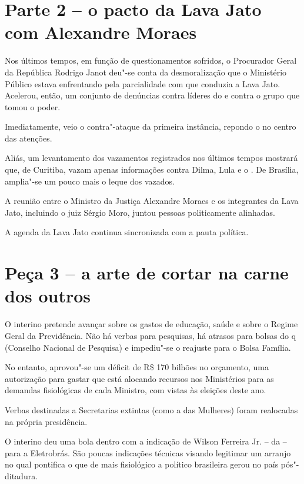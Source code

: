 \section{Parte 2 -- o pacto da Lava Jato com Alexandre Moraes}

Nos últimos tempos, em função de questionamentos sofridos, o Procurador
Geral da República Rodrigo Janot deu"-se conta da desmoralização que o
Ministério Público estava enfrentando pela parcialidade com que conduzia
a Lava Jato. Acelerou, então, um conjunto de denúncias contra líderes do
 e contra o grupo que tomou o poder.

Imediatamente, veio o contra"-ataque da primeira instância, repondo o 
no centro das atenções.

Aliás, um levantamento dos vazamentos registrados nos últimos tempos
mostrará que, de Curitiba, vazam apenas informações contra Dilma, Lula e
o . De Brasília, amplia"-se um pouco mais o leque dos vazados.

A reunião entre o Ministro da Justiça Alexandre Moraes e os integrantes
da Lava Jato, incluindo o juiz Sérgio Moro, juntou pessoas politicamente
alinhadas.

A agenda da Lava Jato continua sincronizada com a pauta política.

\section{Peça 3 -- a arte de cortar na carne dos outros}

O interino pretende avançar sobre os gastos de educação, saúde e sobre o
Regime Geral da Previdência. Não há verbas para pesquisas, há atrasos
para bolsas do q (Conselho Nacional de Pesquisa) e impediu"-se o
reajuste para o Bolsa Família.

No entanto, aprovou"-se um déficit de R\$ 170 bilhões no orçamento, uma
autorização para gastar que está alocando recursos nos Ministérios para
as demandas fisiológicas de cada Ministro, com vistas às eleições deste
ano.

Verbas destinadas a Secretarias extintas (como a das Mulheres) foram
realocadas na própria presidência.

O interino deu uma bola dentro com a indicação de Wilson Ferreira Jr. --
da  -- para a Eletrobrás. São poucas indicações técnicas visando
legitimar um arranjo no qual pontifica o que de mais fisiológico a
político brasileira gerou no país pós"-ditadura.

